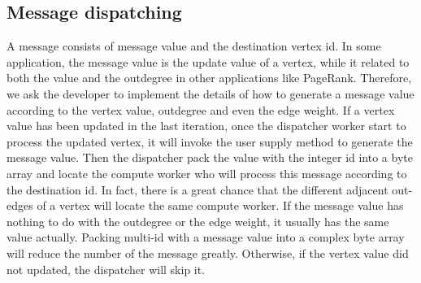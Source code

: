 \documentclass[twocolumn,a4paper,10pt]{article}
\begin{document}
\subsection{Message dispatching}
A message consists of message value and the destination vertex id. In some application, the message value is the update value of a vertex, while it related to both the value and the outdegree in other applications like PageRank. Therefore, we ask the developer to implement the details of how to generate a message value according to the vertex value, outdegree and even the edge weight. If a vertex value has been updated in the last iteration, once the dispatcher worker start to process the updated vertex, it will invoke the user supply method to generate the message value. Then the dispatcher pack the value with the integer id into a byte array and locate the compute worker who will process this message according to the destination id. In fact, there is a great chance that the different adjacent out-edges of a vertex will locate the same compute worker. If the message value has nothing to do with the outdegree or the edge weight, it usually has the same value actually. Packing multi-id with a message value into a complex byte array will reduce the number of the message greatly. Otherwise, if the vertex value did not updated, the dispatcher will skip it.
\end{document}
